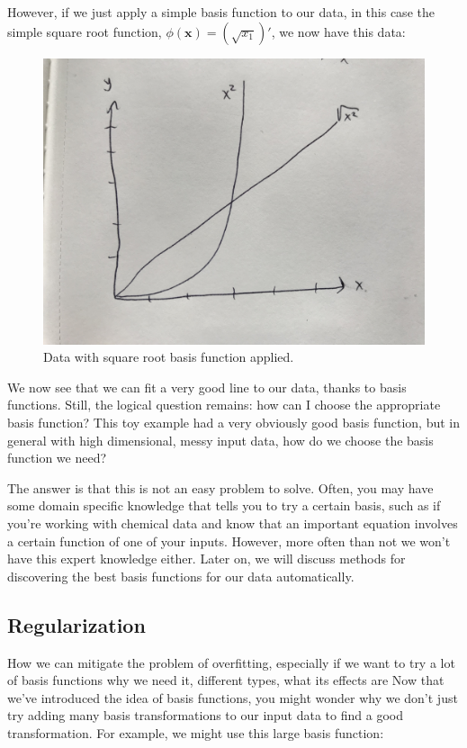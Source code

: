 However, if we just apply a simple basis function to our data, in this case the simple square root function, $\phi(\textbf{x}) = (\sqrt{x_{1}})'$, we now have this data:

\begin{figure}[H]
    \centering
    \includegraphics[width=0.5\paperwidth]{../LinearRegression/fig/lin_reg_w_basis_fn.jpg}
    \caption{Data with square root basis function applied.}
    \label{fig:lin-reg-w-basis-fn-fitted}
\end{figure}

We now see that we can fit a very good line to our data, thanks to basis functions. Still, the logical question remains: how can I choose the appropriate basis function? This toy example had a very obviously good basis function, but in general with high dimensional, messy input data, how do we choose the basis function we need?

The answer is that this is not an easy problem to solve. Often, you may have some domain specific knowledge that tells you to try a certain basis, such as if you're working with chemical data and know that an important equation involves a certain function of one of your inputs. However, more often than not we won't have this expert knowledge either. Later on, we will discuss methods for discovering the best basis functions for our data automatically.

\subsection{Regularization}
How we can mitigate the problem of overfitting, especially if we want to try a lot of basis functions
why we need it, different types, what its effects are
Now that we've introduced the idea of basis functions, you might wonder why we don't just try adding many basis transformations to our input data to find a good transformation. For example, we might use this large basis function:

